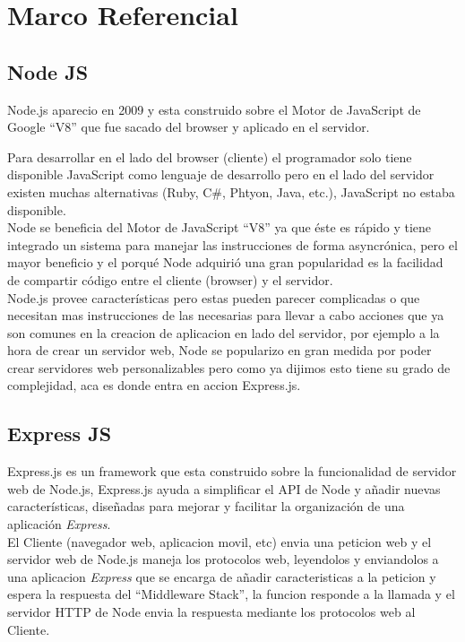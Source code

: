 \chapter{Marco Referencial} %
\label{cha:marco_referncial}

  \section{Node JS}
  \label{sec:node_js}
    Node.js aparecio en 2009 y esta construido sobre el Motor de JavaScript de Google ``V8'' que fue sacado del browser y aplicado en el servidor.

    Para desarrollar en el lado del browser (cliente) el programador solo tiene disponible JavaScript como lenguaje de desarrollo pero en el lado del servidor existen muchas alternativas (Ruby, C\#, Phtyon, Java, etc.), JavaScript no estaba disponible.\\

    Node se beneficia del Motor de JavaScript ``V8'' ya que \'este es r\'apido y tiene integrado un sistema para manejar las instrucciones de forma asyncr\'onica, pero el mayor beneficio y el porqu\'e Node adquiri\'o una gran popularidad es la facilidad de compartir c\'odigo entre el cliente (browser) y el servidor.\\

    Node.js provee caracter\'isticas pero estas pueden parecer complicadas o que necesitan mas instrucciones de las necesarias para llevar a cabo acciones que ya son comunes en la creacion de aplicacion en lado del servidor, por ejemplo a la hora de crear un servidor web, Node se popularizo en gran medida por poder crear servidores web personalizables pero como ya dijimos esto tiene su grado de complejidad, aca es donde entra en accion Express.js.

  \section{Express JS}
  \label{sec:express_js}
    Express.js es un framework que esta construido sobre la funcionalidad de servidor web de Node.js, Express.js ayuda a simplificar el API de Node y a\~nadir nuevas caracter\'isticas, dise\~nadas para mejorar y facilitar la organizaci\'on de una aplicaci\'on \emph{Express}.\\

    El Cliente (navegador web, aplicacion movil, etc) envia una peticion web y el servidor web de Node.js maneja los protocolos web, leyendolos y enviandolos a una aplicacion \emph{Express} que se encarga de a\~nadir caracteristicas a la peticion y espera la respuesta del ``Middleware Stack'', la funcion responde a la llamada y el servidor HTTP de Node envia la respuesta mediante los protocolos web al Cliente.\\

